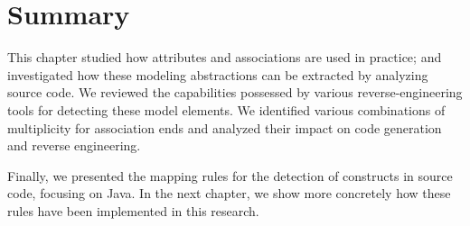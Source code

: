 \section{Summary}

This chapter  studied how attributes and associations are used in practice; and investigated how these modeling abstractions can be extracted by analyzing source code. We reviewed
the capabilities possessed by various reverse-engineering tools for detecting these model elements. We identified various  combinations of multiplicity for association ends and analyzed their impact on code generation and reverse engineering. 

Finally, we presented the  mapping rules for the detection of constructs in source code, focusing on Java. In the next chapter, we show more concretely how these rules have been implemented in this research.


